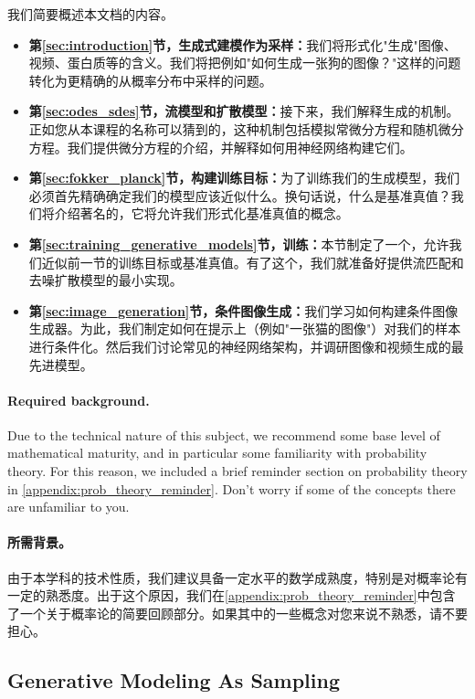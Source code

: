 我们简要概述本文档的内容。
\begin{itemize}
\item \textbf{\sffamily 第\ref{sec:introduction}节，生成式建模作为采样：}我们将形式化"生成"图像、视频、蛋白质等的含义。我们将把例如"如何生成一张狗的图像？"这样的问题转化为更精确的从概率分布中采样的问题。
\item \textbf{\sffamily 第\ref{sec:odes_sdes}节，流模型和扩散模型：}接下来，我们解释生成的机制。正如您从本课程的名称可以猜到的，这种机制包括模拟常微分方程和随机微分方程。我们提供微分方程的介绍，并解释如何用神经网络构建它们。
\item \textbf{\sffamily 第\ref{sec:fokker_planck}节，构建训练目标：}为了训练我们的生成模型，我们必须首先精确确定我们的模型应该近似什么。换句话说，什么是基准真值？我们将介绍著名的，它将允许我们形式化基准真值的概念。
\item \textbf{\sffamily 第\ref{sec:training_generative_models}节，训练：}本节制定了一个，允许我们近似前一节的训练目标或基准真值。有了这个，我们就准备好提供流匹配和去噪扩散模型的最小实现。
\item \textbf{\sffamily 第\ref{sec:image_generation}节，条件图像生成：}我们学习如何构建条件图像生成器。为此，我们制定如何在提示上（例如"一张猫的图像"）对我们的样本进行条件化。然后我们讨论常见的神经网络架构，并调研图像和视频生成的最先进模型。
\end{itemize}

\paragraph{Required background.} Due to the technical nature of this subject, we recommend some base level of mathematical maturity, and in particular some familiarity with probability theory. For this reason, we included a brief reminder section on probability theory in \cref{appendix:prob_theory_reminder}. Don't worry if some of the concepts there are unfamiliar to you.

\paragraph{所需背景。}由于本学科的技术性质，我们建议具备一定水平的数学成熟度，特别是对概率论有一定的熟悉度。出于这个原因，我们在\cref{appendix:prob_theory_reminder}中包含了一个关于概率论的简要回顾部分。如果其中的一些概念对您来说不熟悉，请不要担心。

\subsection{Generative Modeling As Sampling}
\label{subsec:gm_as_sampling}

